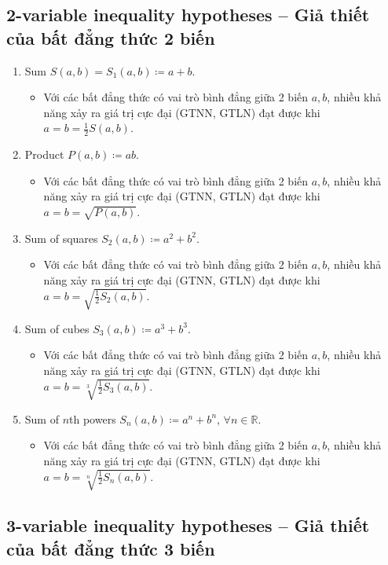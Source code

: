 \documentclass{article}
\begin{document}
\subsection{2-variable inequality hypotheses -- Giả thiết của bất đẳng thức 2 biến}

\begin{enumerate}
	\item Sum $S(a,b) = S_1(a,b)\coloneqq a + b$.
	\begin{itemize}
		\item Với các bất đẳng thức có vai trò bình đẳng giữa 2 biến $a,b$, nhiều khả năng xảy ra giá trị cực đại (GTNN, GTLN) đạt được khi $a = b = \frac{1}{2}S(a,b)$.
	\end{itemize}
	\item Product $P(a,b)\coloneqq ab$.
	\begin{itemize}
		\item Với các bất đẳng thức có vai trò bình đẳng giữa 2 biến $a,b$, nhiều khả năng xảy ra giá trị cực đại (GTNN, GTLN) đạt được khi $a = b = \sqrt{P(a,b)}$.
	\end{itemize}
	\item Sum of squares $S_2(a,b)\coloneqq a^2 + b^2$.
	\begin{itemize}
		\item Với các bất đẳng thức có vai trò bình đẳng giữa 2 biến $a,b$, nhiều khả năng xảy ra giá trị cực đại (GTNN, GTLN) đạt được khi $a = b = \sqrt{\frac{1}{2}S_2(a,b)}$.
	\end{itemize}
	\item Sum of cubes $S_3(a,b)\coloneqq a^3 + b^3$.
	\begin{itemize}
		\item Với các bất đẳng thức có vai trò bình đẳng giữa 2 biến $a,b$, nhiều khả năng xảy ra giá trị cực đại (GTNN, GTLN) đạt được khi $a = b = \sqrt[3]{\frac{1}{2}S_3(a,b)}$.
	\end{itemize}
	\item Sum of $n$th powers $S_n(a,b)\coloneqq a^n + b^n$, $\forall n\in\mathbb{R}$.
	\begin{itemize}
		\item Với các bất đẳng thức có vai trò bình đẳng giữa 2 biến $a,b$, nhiều khả năng xảy ra giá trị cực đại (GTNN, GTLN) đạt được khi $a = b = \sqrt[n]{\frac{1}{2}S_n(a,b)}$.
	\end{itemize}
\end{enumerate}

\subsection{3-variable inequality hypotheses -- Giả thiết của bất đẳng thức 3 biến}
\end{document}
